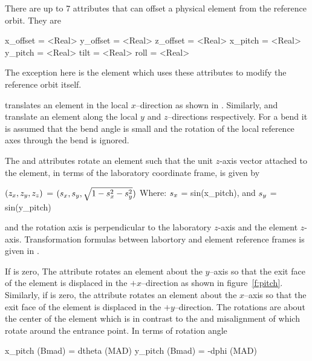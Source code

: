 There are up to 7 attributes that can offset a physical element
from the reference orbit. They are
\begin{example}
  x_offset = <Real>
  y_offset = <Real>
  z_offset = <Real>
  x_pitch  = <Real>
  y_pitch  = <Real>
  tilt     = <Real>
  roll     = <Real>
\end{example}
The exception here is the  element which uses these
attributes to modify the reference orbit itself.

 translates an element in the local $x$--direction
as shown in . Similarly,  and 
 translate an element along the local $y$ and 
$z$--directions respectively. For a bend it is assumed that
the bend angle is small and the rotation of the local reference
axes through the bend is ignored.

The  and  attributes rotate an element such
that the unit $z$-axis vector attached to the element, in terms of the
laboratory coordinate frame, is given by
\begin{example}
  \((z\sb{x}, z\sb{y}, z\sb{z})\) = \((s\sb{x}, s\sb{y}, \sqrt{1 - s\sb{x}\sp{2} - s\sb{y}\sp{2}})\)
  Where: \(s\sb{x}\) = sin(x_pitch), and  \(s\sb{y}\) = sin(y_pitch)
\end{example}
and the rotation axis is perpendicular to the laboratory $z$-axis and
the element $z$-axis. Transformation formulas between labortory and
element reference frames is given in .

If  is zero, The  attribute rotates an element
about the $y$--axis so that the exit face of the element is displaced
in the $+x$--direction as shown in figure~\ref{f:pitch}. Similarly, if
 is zero, the  attribute rotates an element
about the $x$--axis so that the exit face of the element is displaced
in the $+y$--direction. The rotations are about the center of the
element which is in contrast to the  and 
misalignment of \mad which rotate around the entrance point. In terms
of rotation angle
\begin{example}
  x_pitch (Bmad) =  dtheta (MAD)
  y_pitch (Bmad) = -dphi (MAD)
\end{example}


